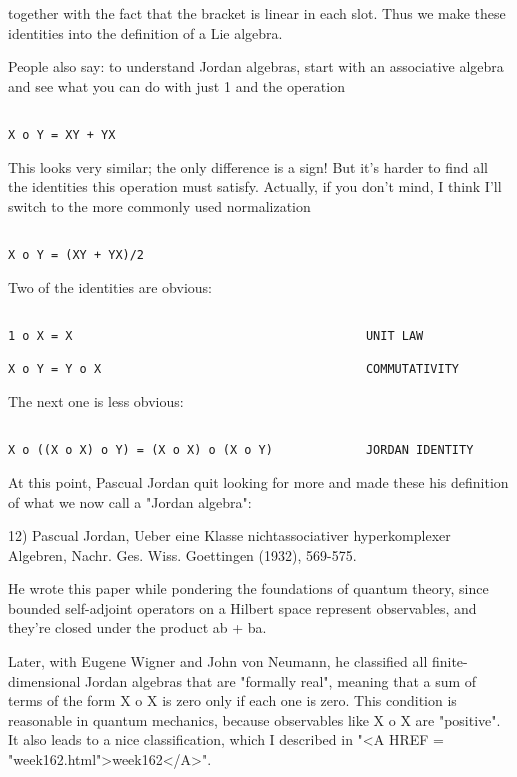 together with the fact that the bracket is linear in each slot.
Thus we make these identities into the definition of a Lie algebra.  

People also say: to understand Jordan algebras, start with an 
associative algebra and see what you can do with just 1 and the 
operation


\begin{verbatim}

X o Y = XY + YX 
\end{verbatim}
    
This looks very similar; the only difference is a sign!  
But it's
harder to find all the identities this operation must satisfy.
Actually, if you don't mind, I think I'll switch to the more commonly
used normalization

\begin{verbatim}

X o Y = (XY + YX)/2
\end{verbatim}
    

Two of the identities are obvious:


\begin{verbatim}

1 o X = X                                         UNIT LAW

X o Y = Y o X                                     COMMUTATIVITY 
\end{verbatim}
    
The next one is less obvious:


\begin{verbatim}

X o ((X o X) o Y) = (X o X) o (X o Y)             JORDAN IDENTITY
\end{verbatim}
    
At this point, Pascual Jordan quit looking for more and made these 
his definition of what we now call a "Jordan algebra":

12) Pascual Jordan, Ueber eine Klasse nichtassociativer hyperkomplexer 
Algebren, Nachr. Ges. Wiss. Goettingen (1932), 569-575.   

He wrote this paper while pondering the foundations of quantum theory,
since bounded self-adjoint operators on a Hilbert space represent
observables, and they're closed under the product ab + ba.

Later, with Eugene Wigner and John von Neumann, he classified all
finite-dimensional Jordan algebras that are "formally real", meaning
that a sum of terms of the form X o X is zero only if each one is zero.
This condition is reasonable in quantum mechanics, because observables
like X o X are "positive".  It also leads to a nice classification,
which I described in "<A HREF = "week162.html">week162</A>".

